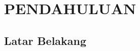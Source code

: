 \pagestyle{fancy}
\lhead{}
\chead{}
\rhead{\thepage}
\lfoot{}
\cfoot{}
\rfoot{}

\renewcommand{\thechapter}{\Roman{chapter}}
\chapter{PENDAHULUAN}\label{babSatu}
\renewcommand{\thechapter}{\arabic{chapter}}
\vspace{8mm}


\section{Latar Belakang}
\vspace{-4mm}
